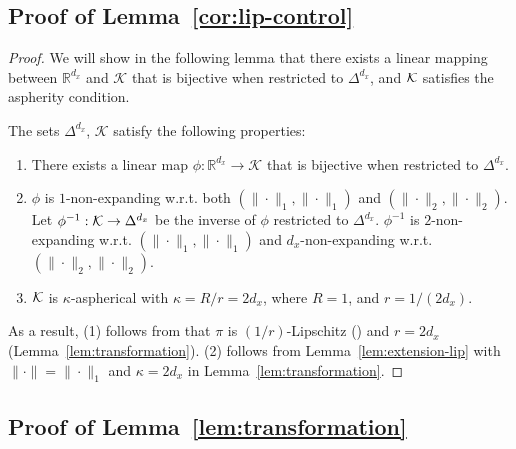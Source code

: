 \subsection{Proof of Lemma~\ref{cor:lip-control}}

\begin{proof}
We will show in the following lemma that there exists a linear mapping between $\mathbb{R}^{d_x}$ and $\mathcal{K}$ that is bijective when restricted to $\Delta^{d_x}$, and $\mathcal{K}$ satisfies the aspherity condition. 


\begin{lemma} [Transformation]
\label{lem:transformation}
The sets $\Delta^{d_x}$, $\mathcal{K}$ satisfy the following properties:
\begin{enumerate}
\item There exists a linear map $\phi:\mathbb{R}^{d_x}\rightarrow\mathcal{K}$ that is bijective when restricted to $\Delta^{d_x}$. 
\item $\phi$ is $1$-non-expanding w.r.t. both $(\|\cdot\|_1,\|\cdot\|_1)$ and $(\|\cdot\|_2, \|\cdot\|_2)$. 
Let $\phi^{-1}:\mathcal{K}\rightarrow\Delta^{d_x}$ be the inverse of $\phi$ restricted to $\Delta^{d_x}$. $\phi^{-1}$ is $2$-non-expanding w.r.t. $(\|\cdot\|_1, \|\cdot\|_1)$ and $d_x$-non-expanding w.r.t. $(\|\cdot\|_2, \|\cdot\|_2)$. 
\item $\mathcal{K}$ is $\kappa$-aspherical with $\kappa=R/r=2d_x$, where $R=1$, and $r=1/(2d_x)$.
\end{enumerate}
\end{lemma}

As a result, (1) follows from that $\pi$ is $(1/r)$-Lipschitz (\cite{lu2023projection}) and $r=2d_x$ (Lemma~\ref{lem:transformation}). (2) follows from Lemma~\ref{lem:extension-lip} with $\|\cdot\|=\|\cdot\|_1$ and $\kappa=2d_x$ in Lemma~\ref{lem:transformation}.
\end{proof}


\subsection{Proof of Lemma~\ref{lem:transformation}}

